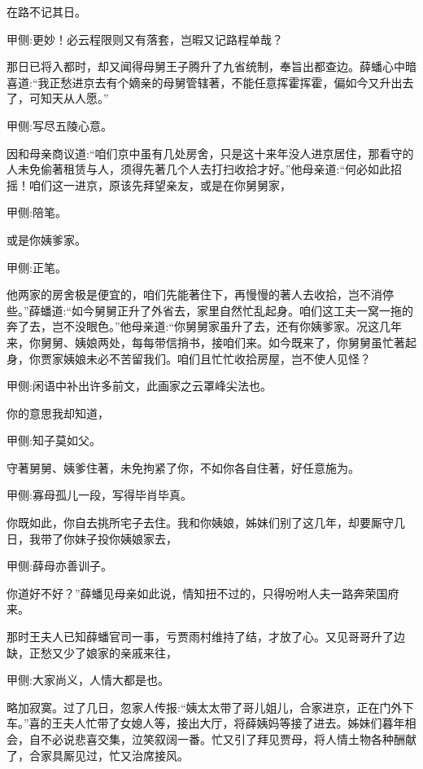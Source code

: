 \begin{parag}
    在路不记其日。\begin{note}甲侧:更妙！必云程限则又有落套，岂暇又记路程单哉？\end{note}那日已将入都时，却又闻得母舅王子腾升了九省统制，奉旨出都查边。薛蟠心中暗喜道:“我正愁进京去有个嫡亲的母舅管辖著，不能任意挥霍挥霍，偏如今又升出去了，可知天从人愿。”\begin{note}甲侧:写尽五陵心意。\end{note}因和母亲商议道:“咱们京中虽有几处房舍，只是这十来年没人进京居住，那看守的人未免偷著租赁与人，须得先著几个人去打扫收拾才好。”他母亲道:“何必如此招摇！咱们这一进京，原该先拜望亲友，或是在你舅舅家，\begin{note}甲侧:陪笔。\end{note}或是你姨爹家。\begin{note}甲侧:正笔。\end{note}他两家的房舍极是便宜的，咱们先能著住下，再慢慢的著人去收拾，岂不消停些。”薛蟠道:“如今舅舅正升了外省去，家里自然忙乱起身。咱们这工夫一窝一拖的奔了去，岂不没眼色。”他母亲道:“你舅舅家虽升了去，还有你姨爹家。况这几年来，你舅舅、姨娘两处，每每带信捎书，接咱们来。如今既来了，你舅舅虽忙著起身，你贾家姨娘未必不苦留我们。咱们且忙忙收拾房屋，岂不使人见怪？\begin{note}甲侧:闲语中补出许多前文，此画家之云罩峰尖法也。\end{note}你的意思我却知道，\begin{note}甲侧:知子莫如父。\end{note}守著舅舅、姨爹住著，未免拘紧了你，不如你各自住著，好任意施为。\begin{note}甲侧:寡母孤儿一段，写得毕肖毕真。\end{note}你既如此，你自去挑所宅子去住。我和你姨娘，姊妹们别了这几年，却要厮守几日，我带了你妹子投你姨娘家去，\begin{note}甲侧:薛母亦善训子。\end{note}你道好不好？”薛蟠见母亲如此说，情知扭不过的，只得吩咐人夫一路奔荣国府来。
\end{parag}


\begin{parag}
    那时王夫人已知薛蟠官司一事，亏贾雨村维持了结，才放了心。又见哥哥升了边缺，正愁又少了娘家的亲戚来往，\begin{note}甲侧:大家尚义，人情大都是也。\end{note}略加寂寞。过了几日，忽家人传报:“姨太太带了哥儿姐儿，合家进京，正在门外下车。”喜的王夫人忙带了女媳人等，接出大厅，将薛姨妈等接了进去。姊妹们暮年相会，自不必说悲喜交集，泣笑叙阔一番。忙又引了拜见贾母，将人情土物各种酬献了，合家具厮见过，忙又治席接风。
\end{parag}


